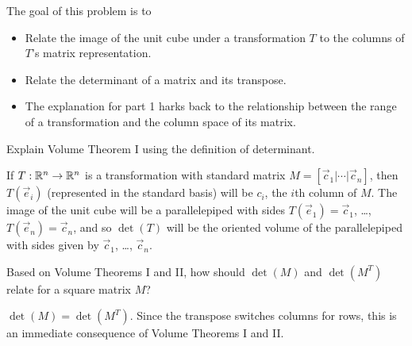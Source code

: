 \documentclass{workbook}
\begin{document}
\begin{slide}
\begin{annotation}
\begin{goals}
			The goal of this problem is to
			\begin{itemize}
				\item Relate the image of the unit cube under a transformation $T$ to the columns
					of $T$'s matrix representation.
				\item Relate the determinant of a matrix and its transpose.
			\end{itemize}
		\end{goals}

		\begin{notes}
			\begin{itemize}
				\item The explanation for part 1 harks back to the relationship between
					the range of a transformation and the column space of its matrix.
			\end{itemize}
		\end{notes}
	\end{annotation}
	\begin{parts}
		\item Explain Volume Theorem I using the definition of determinant.
			\begin{solution}
				If $T:\mathbb{R}^n\to\mathbb{R}^n$ is a transformation with standard matrix $M=[\vec c_1|\cdots|\vec c_n]$,
				then
				$T(\vec e_i)$ (represented in the standard basis) will be $c_i$, the $i$th
				column of $M$. The image of the unit cube will be a parallelepiped
				with sides $T(\vec e_1)=\vec c_1$, \ldots, $T(\vec e_n)=\vec c_n$, and so $\det(T)$
				will be the oriented volume of the parallelepiped with sides given by $\vec c_1$, \ldots, $\vec c_n$.
			\end{solution}
		\item Based on Volume Theorems I and II, how should $\det(M)$ and $\det(M^T)$
			relate for a square matrix $M$?
			\begin{solution}
				$\det(M)=\det(M^T)$. Since the transpose switches columns for rows,
				this is an immediate consequence of Volume Theorems I and II.
			\end{solution}
	\end{parts}
	\begin{bookonly}\end{bookonly}
\end{slide}
\end{document}
